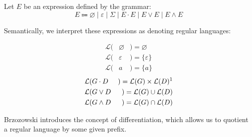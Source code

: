 \documentclass[sigplan,review,acmsmall,nonacm,screen,anonymous]{acmart}\settopmatter{printfolios=false,printccs=false,printacmref=false}
\begin{document}
  \begin{definition}
    Let \( E \) be an expression defined by the grammar:
    \[
      E \Coloneqq \varnothing \mid \varepsilon \mid \Sigma \mid E \cdot E \mid E \lor E \mid E \land E
    \]

    Semantically, we interpret these expressions as denoting regular languages:
    \setlength{\columnseprule}{0pt}
    \setlength{\columnsep}{-3cm}
    \begin{multicols}{2}
      \begin{eqnarray*}
        \mathcal{L}(& \varnothing & ) = \varnothing \\
        \mathcal{L}(& \varepsilon & ) = \{\varepsilon\} \\
        \mathcal{L}(& a           & ) = \{a\}
      \end{eqnarray*} \break\vspace{-0.45cm}
      \begin{eqnarray*}
        \mathcal{L}(& G\cdot D & ) = \mathcal{L}(G) \times \mathcal{L}(D)\text{\footnotemark}\\
        \mathcal{L}(& G\vee  D & ) = \mathcal{L}(G) \cup   \mathcal{L}(D)\\
        \mathcal{L}(& G\land D & ) = \mathcal{L}(G) \cap   \mathcal{L}(D)
      \end{eqnarray*}
    \end{multicols}
  \end{definition}

  Brzozowski introduces the concept of differentiation, which allows us to quotient a regular language by some given prefix.
\end{document}
